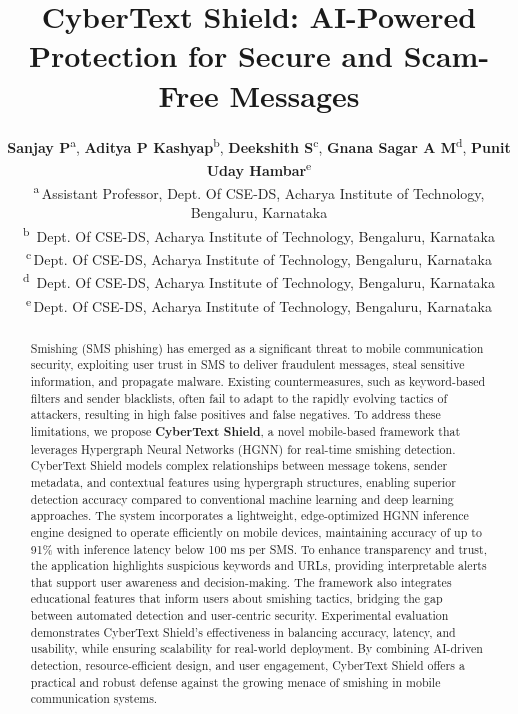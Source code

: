 \documentclass[conference]{IEEEtran}
\begin{document}
\title{CyberText Shield: AI-Powered Protection for Secure and Scam-Free Messages}

\author{
\textbf{Sanjay P}\textsuperscript{a}, \textbf{Aditya P Kashyap}\textsuperscript{b}, \textbf{Deekshith S}\textsuperscript{c}, \textbf{Gnana Sagar A M}\textsuperscript{d}, \textbf{Punit Uday Hambar}\textsuperscript{e}
 \\
\textsuperscript{a}\,Assistant Professor, Dept. Of CSE-DS, Acharya Institute of Technology, Bengaluru, Karnataka \\
\textsuperscript{b}\, Dept. Of CSE-DS, Acharya Institute of Technology, Bengaluru, Karnataka \\
\textsuperscript{c}\,Dept. Of CSE-DS, Acharya Institute of Technology, Bengaluru, Karnataka \\
\textsuperscript{d}\, Dept. Of CSE-DS, Acharya Institute of Technology, Bengaluru, Karnataka \\
\textsuperscript{e}\,Dept. Of CSE-DS, Acharya Institute of Technology, Bengaluru, Karnataka \\
}





\maketitle

\begin{abstract}
Smishing (SMS phishing) has emerged as a significant threat to mobile communication security, exploiting user trust in SMS to deliver fraudulent messages, steal sensitive information, and propagate malware. Existing countermeasures, such as keyword-based filters and sender blacklists, often fail to adapt to the rapidly evolving tactics of attackers, resulting in high false positives and false negatives. To address these limitations, we propose \textbf{CyberText Shield}, a novel mobile-based framework that leverages Hypergraph Neural Networks (HGNN) for real-time smishing detection. CyberText Shield models complex relationships between message tokens, sender metadata, and contextual features using hypergraph structures, enabling superior detection accuracy compared to conventional machine learning and deep learning approaches. The system incorporates a lightweight, edge-optimized HGNN inference engine designed to operate efficiently on mobile devices, maintaining accuracy of up to 91\% with inference latency below 100 ms per SMS. To enhance transparency and trust, the application highlights suspicious keywords and URLs, providing interpretable alerts that support user awareness and decision-making. The framework also integrates educational features that inform users about smishing tactics, bridging the gap between automated detection and user-centric security. Experimental evaluation demonstrates CyberText Shield’s effectiveness in balancing accuracy, latency, and usability, while ensuring scalability for real-world deployment. By combining AI-driven detection, resource-efficient design, and user engagement, CyberText Shield offers a practical and robust defense against the growing menace of smishing in mobile communication systems.
\end{abstract}
\end{document}
